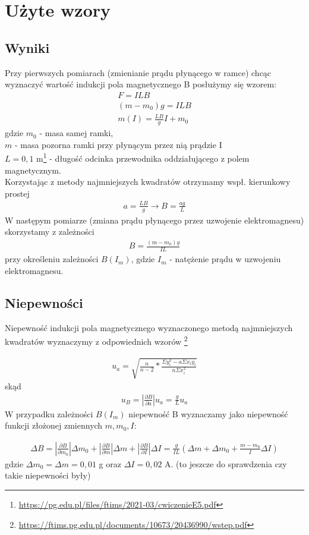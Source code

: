 \documentclass{article}
\begin{document}
\section{Użyte wzory}

\subsection{Wyniki}
Przy pierwszych pomiarach (zmienianie prądu płynącego w ramce) chcąc wyznaczyć 
wartość indukcji pola magnetycznego B posłużymy się wzorem:
\begin{gather*}
	F = ILB \\
	(m-m_0)g = ILB \\
	m(I) = \frac{LB}{g}I + m_0
\end{gather*} 
gdzie $m_0$ - masa samej ramki,\\
$m$ - masa pozorna ramki przy płynącym przez nią prądzie I \\
$L=0,1$ m\footnote{\url{https://pg.edu.pl/files/ftims/2021-03/cwiczenieE5.pdf}} - długość odcinka przewodnika oddziałującego z polem magnetycznym. \\
Korzystając z metody najmniejszych kwadratów otrzymamy wspł.  kierunkowy prostej
\begin{gather*}
	a = \frac{LB}{g} \rightarrow B = \frac{ag}{L}
\end{gather*}
W następym pomiarze (zmiana prądu płynącego przez uzwojenie elektromagnesu) skorzystamy z zależności
\begin{gather*}
	B = \frac{(m-m_0)g}{IL}
\end{gather*}
przy określeniu zależności $B(I_m)$, gdzie $I_m$ - natężenie prądu w uzwojeniu elektromagnesu.

\subsection{Niepewności}
Niepewność indukcji pola magnetycznego wyznaczonego metodą najmniejszych kwadratów wyznaczymy z odpowiednich wzorów  \footnote{\url{https://ftims.pg.edu.pl/documents/10673/20436990/wstep.pdf}}\:

\begin{gather*}
		u_a = \sqrt{\frac{n}{n-2} * \frac{\Sigma y_i^2 - a\Sigma x_iy_i}{n\Sigma x_i^2}} 
\end{gather*}
skąd
\begin{gather*}
		u_B= |\frac{\partial B}{\partial a}| u_a = \frac{g}{L}u_a
\end{gather*}
W przypadku zależności $B(I_m)$ niepewność B wyznaczamy jako niepewność funkcji złożonej zmiennych 
$m, m_0, I$:

\begin{gather*}
		\Delta B = |\frac{\partial B}{\partial m_0}|\Delta m_0 + |\frac{\partial B}{\partial m}|\Delta m + |\frac{\partial B}{\partial I}|\Delta I = \frac{g}{IL}(\Delta m + \Delta m_0 + \frac{m-m_0}{I}\Delta I)
\end{gather*}
gdzie $\Delta m_0 =\Delta m = 0,01$ g oraz $\Delta I = 0,02$ A. (to jeszcze do sprawdzenia czy takie niepewności były)
\end{document}
